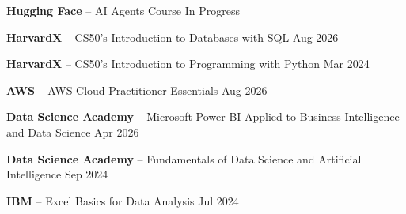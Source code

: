 \begin{zitemize}
\setlength{\itemsep}{0.2em}
\item \textbf{Hugging Face} – AI Agents Course \hfill In Progress
\item \textbf{HarvardX} – CS50's Introduction to Databases with SQL \hfill Aug 2026
\item \textbf{HarvardX} – CS50's Introduction to Programming with Python \hfill Mar 2024
\item \textbf{AWS} – AWS Cloud Practitioner Essentials \hfill Aug 2026
\item \textbf{Data Science Academy} – Microsoft Power BI Applied to Business Intelligence and Data Science \hfill Apr 2026
\item \textbf{Data Science Academy} – Fundamentals of Data Science and Artificial Intelligence \hfill Sep 2024
\item \textbf{IBM} – Excel Basics for Data Analysis \hfill Jul 2024
\end{zitemize}